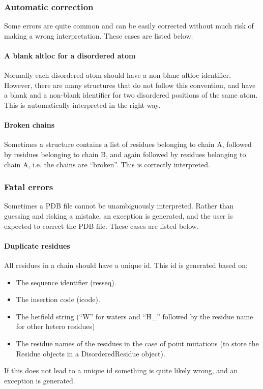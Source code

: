\documentclass{report}
\begin{document}
\subsubsection{Automatic correction}

Some errors are quite common and can be easily corrected without much risk of
making a wrong interpretation. These cases are listed below.

\paragraph{A blank altloc for a disordered atom}

Normally each disordered atom should have a non-blanc altloc identifier. However,
there are many structures that do not follow this convention, and have a blank
and a non-blank identifier for two disordered positions of the same atom. This
is automatically interpreted in the right way.

\paragraph{Broken chains}

Sometimes a structure contains a list of residues belonging to chain A, followed
by residues belonging to chain B, and again followed by residues belonging to
chain A, i.e. the chains are {}``broken{}''. This is correctly interpreted.

\subsubsection{Fatal errors}

Sometimes a PDB file cannot be unambiguously interpreted. Rather than guessing
and risking a mistake, an exception is generated, and the user is expected to
correct the PDB file. These cases are listed below.

\paragraph{Duplicate residues}

All residues in a chain should have a unique id. This id is generated based
on:

\begin{itemize}
\item The sequence identifier (resseq).
\item The insertion code (icode).
\item The hetfield string ({}``W{}'' for waters and {}``H\_{}'' followed by the
residue name for other hetero residues)
\item The residue names of the residues in the case of point mutations (to store the
Residue objects in a DisorderedResidue object).
\end{itemize}
If this does not lead to a unique id something is quite likely wrong, and an
exception is generated.
\end{document}

